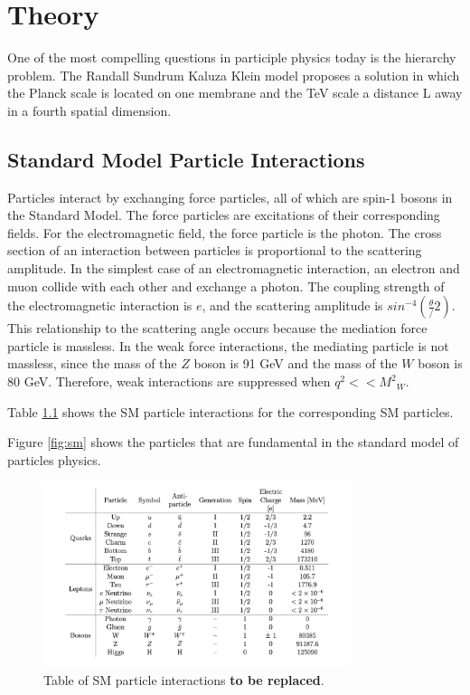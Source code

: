 \chapter{Theory}\label{chap:cms}


One of the most compelling questions in participle physics today is the hierarchy problem. The Randall Sundrum Kaluza Klein model proposes a solution in which the Planck scale is located on one membrane and the TeV scale a distance L away in a fourth spatial dimension. 


\section{Standard Model Particle Interactions}

Particles interact by exchanging force particles, all of which are spin-1 bosons in the Standard Model. The force particles are excitations of their corresponding fields. For the electromagnetic field, the force particle is the photon. The cross section of an interaction between particles is proportional to the scattering amplitude. In the simplest case of an electromagnetic interaction, an electron and muon collide with each other and exchange a photon. The coupling strength of the electromagnetic interaction is $e$, and the scattering amplitude is $sin^{-4}(\frac{\theta}/{2})$. This relationship to the scattering angle occurs because the mediation force particle is massless. In the weak force interactions, the mediating particle is not massless, since the mass of the $Z$ boson is 91 GeV and the mass of the $W$ boson is 80 GeV. Therefore, weak interactions are suppressed when $q^2 << {M^{2}}_{W}$.


Table \ref{fig:smtable} shows the SM particle interactions for the corresponding SM particles.

Figure \ref{fig:sm} shows the particles that are fundamental in the standard model of particles physics.
 \begin{figure}[h]
\centering
\includegraphics[width=0.8\textwidth]{figures/sm_table.png}
\caption{Table of SM particle interactions \textbf{to be replaced}.}
\label{fig:smtable}
\end{figure}


